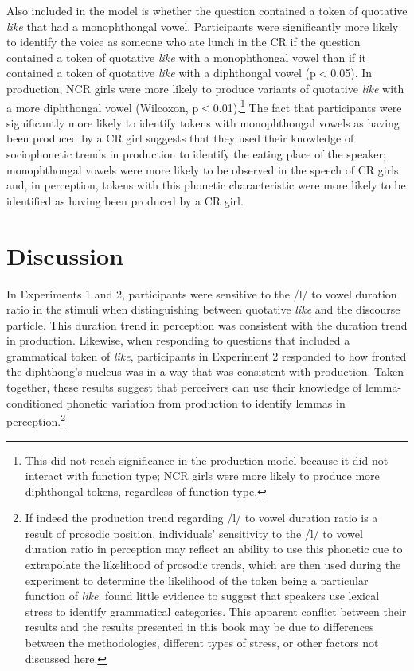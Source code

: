 Also included in the model is whether the question contained a token of quotative \textit{like} that had a monophthongal vowel. Participants were significantly more likely to identify the voice as someone who ate lunch in the CR if the question contained a token of quotative \textit{like} with a monophthongal vowel than if it contained a token of quotative \textit{like} with a diphthongal vowel (p$<$0.05). In production, NCR girls were more likely to produce variants of quotative \textit{like} with a more diphthongal vowel (Wilcoxon, p$<$0.01).\footnote{This did not reach significance in the production model because it did not interact with function type; NCR girls were more likely to produce more diphthongal tokens, regardless of function type.} The fact that participants were significantly more likely to identify tokens with monophthongal vowels as having been produced by a CR girl suggests that they used their knowledge of sociophonetic trends in production to identify the eating place of the speaker; monophthongal vowels were more likely to be observed in the speech of CR girls and, in perception, tokens with this phonetic characteristic were more likely to be identified as having been produced by a CR girl. 

\section{Discussion}

In Experiments 1 and 2, participants were sensitive to the /l/ to vowel duration ratio in the stimuli when distinguishing between quotative \textit{like} and the discourse particle. This duration trend in perception was consistent with the duration trend in production. Likewise, when responding to questions that included a grammatical token of \textit{like}, participants in Experiment 2 responded to how fronted the diphthong's nucleus was in a way that was consistent with production. Taken together, these results suggest that perceivers can use their knowledge of lemma-conditioned phonetic variation from production to identify lemmas in perception.\footnote{If indeed the production trend regarding /l/ to vowel duration ratio is a result of prosodic position, individuals' sensitivity to the /l/ to vowel duration ratio in perception may reflect an ability to use this phonetic cue to extrapolate the likelihood of prosodic trends, which are then used during the experiment to determine the likelihood of the token being a particular function of \textit{like}. \citet{cutlerclifton1984} found little evidence to suggest that speakers use lexical stress to identify grammatical categories. This apparent conflict between their results and the results presented in this book may be due to differences between the methodologies, different types of stress, or other factors not discussed here.}

